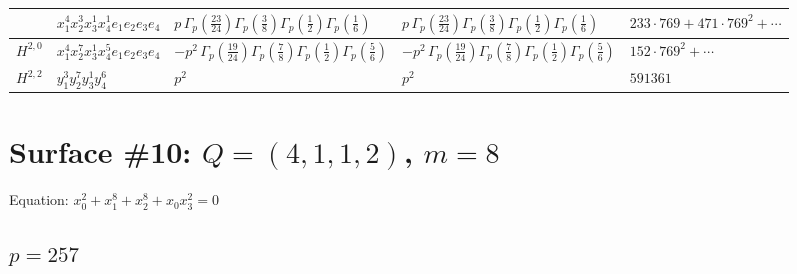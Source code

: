 \documentclass[11pt]{article}
\begin{document}
\begin{table}[ht]
{\begin{tabular}{@{}lllll@{}}
 & $x_{1}^{4} x_{2}^{3} x_{3}^{1} x_{4}^{1}  e_{1} e_{2} e_{3} e_{4}$ & $p \, \Gamma_p \left( \frac{23}{24} \right) \Gamma_p \left( \frac{3}{8} \right) \Gamma_p \left( \frac{1}{2} \right) \Gamma_p \left( \frac{1}{6} \right)$ & $p \, \Gamma_p \left( \frac{23}{24} \right) \Gamma_p \left( \frac{3}{8} \right) \Gamma_p \left( \frac{1}{2} \right) \Gamma_p \left( \frac{1}{6} \right)$ & $233{\cdot}769{+}471{\cdot}769^{2}{+}\cdots$ \\
\midrule
$H^{2,0}$ & $x_{1}^{4} x_{2}^{7} x_{3}^{1} x_{4}^{5}  e_{1} e_{2} e_{3} e_{4}$ & $- p^{2} \, \Gamma_p \left( \frac{19}{24} \right) \Gamma_p \left( \frac{7}{8} \right) \Gamma_p \left( \frac{1}{2} \right) \Gamma_p \left( \frac{5}{6} \right)$ & $- p^{2} \, \Gamma_p \left( \frac{19}{24} \right) \Gamma_p \left( \frac{7}{8} \right) \Gamma_p \left( \frac{1}{2} \right) \Gamma_p \left( \frac{5}{6} \right)$ & $152{\cdot}769^{2}{+}\cdots$ \\
\midrule
$H^{2,2}$ & $y_{1}^{3} y_{2}^{7} y_{3}^{1} y_{4}^{6}$ & $p^{2} \,$ & $p^{2} \,$ & $591361$ \\
\bottomrule
\end{tabular}
}
\renewcommand{\arraystretch}{1.0}
\end{table}

\newpage

\section*{Surface \#10: $Q=(4, 1, 1, 2)$, $m=8$}

Equation: $x_0^{2} + x_1^{8} + x_2^{8} + x_0 x_3^{2} = 0$

\subsection*{$p = 257$}
\end{document}
